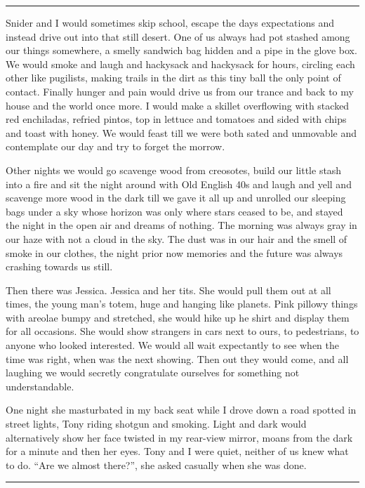 \documentclass[ebook, 10pt, openright, onecolumn]{memoir}
\newcommand*\starbreak{\fancybreak*{\Large{* * *}}}
\begin{document}
\starbreak

Snider and I would sometimes skip school, escape the days expectations and
instead drive out into that still desert.  One of us always had pot stashed
among our things somewhere, a smelly sandwich bag hidden and a pipe in the glove
box. We would smoke and laugh and hackysack and hackysack for hours, circling
each other like pugilists, making trails in the dirt as this tiny ball the only
point of contact.  Finally hunger and pain would drive us from our trance and
back to my house and the world once more.  I would make a skillet overflowing
with stacked red enchiladas, refried pintos, top in lettuce and tomatoes and
sided with chips and toast with honey.  We would feast till we were both sated
and unmovable and contemplate our day and try to forget the morrow.

Other nights we would go scavenge wood from creosotes, build our little
stash into a fire and sit the night around with Old English 40s and laugh and
yell and scavenge more wood in the dark till we gave it all up and unrolled our
sleeping bags under a sky whose horizon was only where stars ceased to be, and
stayed the night in the open air and dreams of nothing.  The morning was always
gray in our haze with not a cloud in the sky.  The dust was in our hair and the
smell of smoke in our clothes, the night prior now memories and the future was
always crashing towards us still.

Then there was Jessica. Jessica and her tits.  She would pull them out at all
times, the young man's totem, huge and hanging like planets.  Pink pillowy
things with areolae bumpy and stretched, she would hike up he shirt and display
them for all occasions.  She would show strangers in cars next to ours, to
pedestrians, to anyone who looked interested.  We would all wait expectantly to
see when the time was right, when was the next showing. Then out they would
come, and all laughing we would secretly congratulate ourselves for something
not understandable.

One night she masturbated in my back seat while I drove down a road spotted in
street lights, Tony riding shotgun and smoking.  Light and dark would
alternatively show her face twisted in my rear-view mirror, moans from the dark
for a minute and then her eyes.  Tony and I were quiet, neither of us knew what
to do.  ``Are we almost there?'', she asked casually when she was done.

\starbreak
\end{document}
